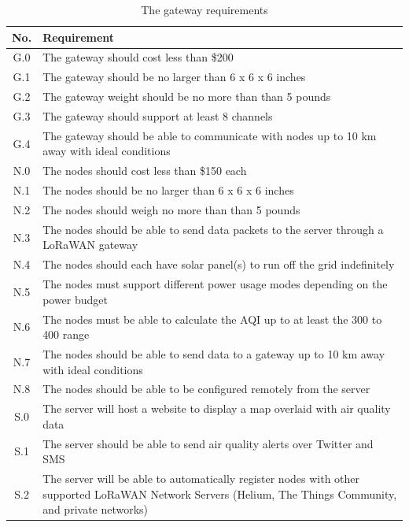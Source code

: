 \begin{table}[H]
\centering
\caption{The gateway requirements}
\begin{tabularx}{\linewidth}{|c|X|}
\hline
No. & Requirement \\
\hline\hline
G.0 & The gateway should cost less than \$200 \\\hline
G.1 & The gateway should be no larger than 6 x 6 x 6 inches \\\hline
G.2 & The gateway weight should be no more than than 5 pounds \\\hline
G.3 & The gateway should support at least 8 channels \\\hline
G.4 & The gateway should be able to communicate with nodes up to 10 km away with ideal conditions \\\hline

N.0 & The nodes should cost less than \$150 each \\\hline
N.1 & The nodes should be no larger than 6 x 6 x 6 inches \\\hline
N.2 & The nodes should weigh no more than than 5 pounds \\\hline
N.3 & The nodes should be able to send data packets to the server through a LoRaWAN gateway \\\hline
N.4 & The nodes should each have solar panel(s) to run off the grid indefinitely \\\hline
N.5 & The nodes must support different power usage modes depending on the power budget \\\hline
N.6 & The nodes must be able to calculate the AQI up to at least the 300 to 400 range \\\hline
N.7 & The nodes should be able to send data to a gateway up to 10 km away with ideal conditions \\\hline
N.8 & The nodes should be able to be configured remotely from the server \\\hline

S.0 & The server will host a website to display a map overlaid with air quality data \\\hline
S.1 & The server should be able to send air quality alerts over Twitter and SMS \\\hline
S.2 & The server will be able to automatically register nodes with other supported LoRaWAN Network Servers (Helium, The Things Community, and private networks) \\\hline
\end{tabularx}
\label{tab:server-requirements}
\end{table}


